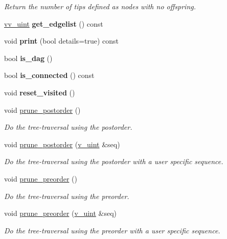 \begin{DoxyCompactItemize}
\begin{DoxyCompactList}\small\item\em Return the number of tips defined as nodes with no offspring. \end{DoxyCompactList}\item 
\hyperlink{namespacepruner_acc0badaa0c5a170f5f93cfc20ec428a2}{vv\+\_\+uint} {\bfseries get\+\_\+edgelist} () const \hypertarget{classpruner_1_1Tree_a700fd8abdcb805f53999b2fb00fc2710}{}\label{classpruner_1_1Tree_a700fd8abdcb805f53999b2fb00fc2710}

\item 
void {\bfseries print} (bool details=true) const \hypertarget{classpruner_1_1Tree_afe757ac173ac177a0ebefd222a06eed5}{}\label{classpruner_1_1Tree_afe757ac173ac177a0ebefd222a06eed5}

\item 
bool {\bfseries is\+\_\+dag} ()\hypertarget{classpruner_1_1Tree_af793b391043a88ceea805b584efb982a}{}\label{classpruner_1_1Tree_af793b391043a88ceea805b584efb982a}

\item 
bool {\bfseries is\+\_\+connected} () const \hypertarget{classpruner_1_1Tree_ad47fa64c50fa9931f4e98d4dc4b94272}{}\label{classpruner_1_1Tree_ad47fa64c50fa9931f4e98d4dc4b94272}

\item 
void {\bfseries reset\+\_\+visited} ()\hypertarget{classpruner_1_1Tree_a3ff712c25817e2bb3d1a87baef7b87d0}{}\label{classpruner_1_1Tree_a3ff712c25817e2bb3d1a87baef7b87d0}

\item 
void \hyperlink{classpruner_1_1Tree_a7d465880d18acf79f3a772ea5412b0d7}{prune\+\_\+postorder} ()
\begin{DoxyCompactList}\small\item\em Do the tree-\/traversal using the postorder. \end{DoxyCompactList}\item 
void \hyperlink{classpruner_1_1Tree_a8318027f3d2b1a07bf25e813c7c80056}{prune\+\_\+postorder} (\hyperlink{namespacepruner_af0145646bd7ede012cd336b416bc5579}{v\+\_\+uint} \&seq)
\begin{DoxyCompactList}\small\item\em Do the tree-\/traversal using the postorder with a user specific sequence. \end{DoxyCompactList}\item 
void \hyperlink{classpruner_1_1Tree_ac85bfb083b3856e65987e1d15885a61c}{prune\+\_\+preorder} ()
\begin{DoxyCompactList}\small\item\em Do the tree-\/traversal using the preorder. \end{DoxyCompactList}\item 
void \hyperlink{classpruner_1_1Tree_a6841109c7ff37bcabdf3a4d79009ad21}{prune\+\_\+preorder} (\hyperlink{namespacepruner_af0145646bd7ede012cd336b416bc5579}{v\+\_\+uint} \&seq)
\begin{DoxyCompactList}\small\item\em Do the tree-\/traversal using the preorder with a user specific sequence. \end{DoxyCompactList}\end{DoxyCompactItemize}
